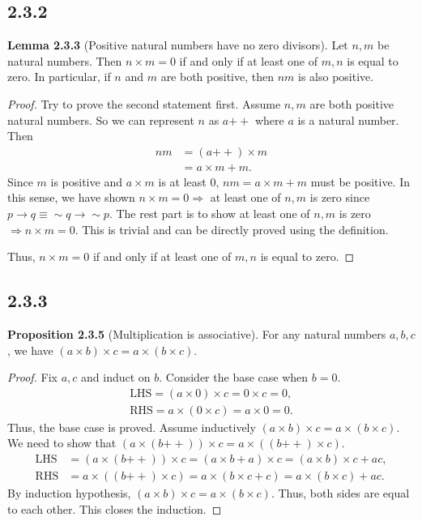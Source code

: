 \documentclass[12pt, letter]{article}
\begin{document}
\subsection*{2.3.2}
\textbf{Lemma 2.3.3} (Positive natural numbers have no zero divisors). Let $n,m$ be natural numbers. Then $n\times m=0$ if and only if at least one of $m,n$ is equal to zero. In particular, if $n$ and $m$ are both positive, then $nm$ is also positive.
\begin{proof}
    Try to prove the second statement first. Assume $n,m$ are both positive natural numbers. So we can represent $n$ as $a\mathtt{++}$ where $a$ is a natural number. Then 
    \begin{equation*}
        \begin{aligned}
            nm&=(a\mathtt{++})\times m\\
            &=a\times m+m.
        \end{aligned}
    \end{equation*}
    Since $m$ is positive and $a\times m$ is at least 0, $nm=a\times m+m$ must be positive. In this sense, we have shown $n\times m=0\Rightarrow$ at least one of $n,m$ is zero since\\ 
    $p\rightarrow q\equiv \sim q\rightarrow \sim p$. The rest part is to show at least one of $n,m$ is zero $\Rightarrow n\times m=0$. This is trivial and can be directly proved using the definition. 

    Thus, $n\times m=0$ if and only if at least one of $m,n$ is equal to zero.
\end{proof}
\subsection*{2.3.3}
\textbf{Proposition 2.3.5} (Multiplication is associative). For any natural numbers $a,b,c$, we have $(a\times b)\times c=a\times (b\times c)$.
\begin{proof}
    Fix $a,c$ and induct on $b$. Consider the base case when $b=0$. 
    \begin{equation*}
        \begin{aligned}
            \text{LHS}=(a\times 0)\times c=0\times c=0,\\
            \text{RHS}=a\times(0\times c)=a\times 0=0.
        \end{aligned}
    \end{equation*}
    Thus, the base case is proved. Assume inductively $(a\times b)\times c=a\times(b\times c)$. We need to show that $(a\times(b\mathtt{++}))\times c=a\times((b\mathtt{++})\times c)$.
    \begin{equation*}
        \begin{aligned}
            \text{LHS}&=(a\times(b\mathtt{++}))\times c=(a\times b+a)\times c=(a\times b)\times c+ac,\\
            \text{RHS}&=a\times ((b\mathtt{++})\times c)=a\times(b\times c+c)=a\times (b\times c)+ac.
        \end{aligned}
    \end{equation*}
    By induction hypothesis, $(a\times b)\times c=a\times(b\times c)$. Thus, both sides are equal to each other. This closes the induction.
\end{proof}
\end{document}
